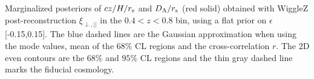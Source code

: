 \label{fig:HDA_z48_epsilon0.15} Marginalized posteriors of $cz/H/r_{\rm s}$ and $D_{\rm A}/r_{\rm s}$ (red solid) obtained with WiggleZ post-reconstruction $\xi_{\perp, ||}$ in the $0.4<z<0.8$ bin, using a flat prior on $\epsilon$ [-0.15,0.15]. The blue dashed lines are the Gaussian approximation when using the mode values, mean of the 68$\%$ CL regions and the cross-correlation $r$. The 2D even contours are the $68\%$ and $95\%$ CL regions and the thin gray dashed line marks the fiducial cosmology. 